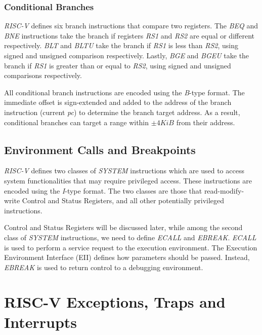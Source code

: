 \subsubsection{Conditional Branches}
\label{subsubsec:riscv_conditionalb}

\textit{RISC-V} defines six branch instructions that compare two registers. The
\textit{BEQ} and \textit{BNE} instructions take the branch if registers \textit{RS1}
and \textit{RS2} are equal or different respectively. \textit{BLT} and \textit{BLTU}
take the branch if \textit{RS1} is less than \textit{RS2}, using signed and
unsigned comparison respectively. Lastly, \textit{BGE} and \textit{BGEU} take
the branch if \textit{RS1} is greater than or equal to \textit{RS2}, using signed
and unsigned comparisons respectively.

All conditional branch instructions are encoded using the \textit{B}-type format.
The immediate offset is sign-extended and added to the address of the branch instruction
(current \textit{pc}) to determine the branch target address. As a result,
conditional branches can target a range within $\pm 4 \textit{KiB}$ from their
address.

\subsection{Environment Calls and Breakpoints}
\label{subsec:riscv_ecalls}

\textit{RISC-V} defines two classes of \textit{SYSTEM} instructions which are used
to access system functionalities that may require privileged access. These
instructions are encoded using the \textit{I}-type format. The two classes are
those that read-modify-write Control and Status Registers, and all other potentially
privileged instructions.

Control and Status Registers will be discussed later, while among the second
class of \textit{SYSTEM} instructions, we need to define \textit{ECALL} and \textit{EBREAK}.
\textit{ECALL} is used to perform a service request to the execution environment.
The Execution Environment Interface (EII) defines how parameters should be passed.
Instead, \textit{EBREAK} is used to return control to a debugging environment.

\section{RISC-V Exceptions, Traps and Interrupts}
\label{sec:riscv_eti}

